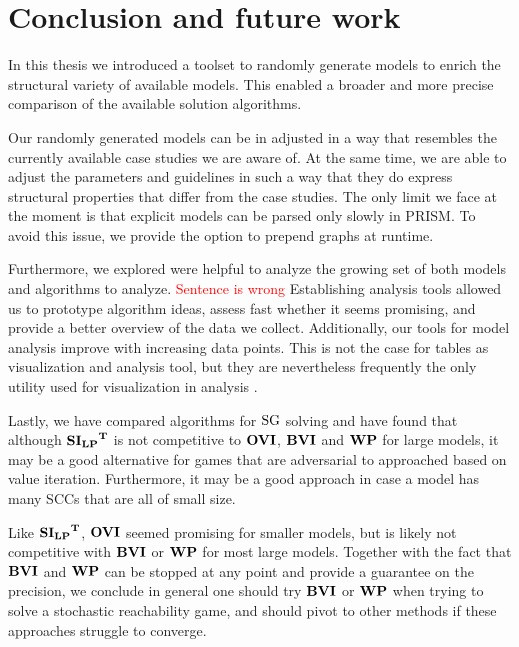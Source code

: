 \chapter{Conclusion and future work} \label{ch:conclusion}
In this thesis we introduced a toolset to randomly generate models to enrich the structural variety of available models.
This enabled a broader and more precise comparison of the available solution algorithms.

Our randomly generated models can be in adjusted in a way that resembles the currently available case studies we are aware of.
At the same time, we are able to adjust the parameters and guidelines in such a way that they do express structural properties that differ from the case studies.
The only limit we face at the moment is that explicit models can be parsed only slowly in PRISM. 
To avoid this issue, we provide the option to prepend graphs at runtime.

Furthermore, we explored were helpful to analyze the growing set of both models and algorithms to analyze. \textcolor{red}{Sentence is wrong}
Establishing analysis tools allowed us to prototype algorithm ideas, assess fast whether it seems promising,
and provide a better overview of the data we collect. 
Additionally, our tools for model analysis improve with increasing data points.
This is not the case for tables as visualization and analysis tool, 
but they are nevertheless frequently the only utility used for visualization in analysis \cite{paperMaxi,widestPath,learningBased}.

Lastly, we have compared algorithms for $\textrm{SG}$ solving and have found that although $\mathbf{\mathbf{SI_{LP}}^T}$ is not competitive to $\mathbf{OVI}$, $\mathbf{BVI}$ and $\mathbf{WP}$ for large models,
it may be a good alternative for games that are adversarial to approached based on value iteration. 
Furthermore, it may be a good approach in case a model has many SCCs that are all of small size.

Like $\mathbf{\mathbf{SI_{LP}}^T}$, $\mathbf{OVI}$ seemed promising for smaller models, but is likely not competitive with $\mathbf{BVI}$ or $\mathbf{WP}$ for most large models.
Together with the fact that $\mathbf{BVI}$ and $\mathbf{WP}$ can be stopped at any point and provide a guarantee on the precision, 
we conclude in general one should try $\mathbf{BVI}$ or $\mathbf{WP}$ when trying to solve a stochastic reachability game, 
and should pivot to other methods if these approaches struggle to converge.

